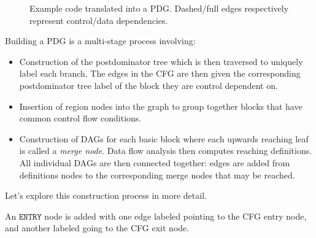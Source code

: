 \begin{figure}
\centering
{}
\caption{Example code translated into a PDG. Dashed/full edges respectively represent control/data dependencies.}
\label{fig:pdg}
\end{figure}

Building a PDG is a multi-stage process involving:

\begin{itemize}
\item Construction of the postdominator tree which is then traversed to uniquely label each branch. The edges in the CFG are then given the corresponding postdominator tree label of the block they are control dependent on.
\item Insertion of region nodes into the graph to group together blocks that have common control flow conditions.
\item Construction of DAGs for each basic block where each upwards reaching leaf is called a \textit{merge node}. Data flow analysis then computes reaching definitions. All individual DAGs are then connected together: edges are added from definitions nodes to the corresponding merge nodes that may be reached.
\end{itemize}

Let's explore this construction process in more detail.

An $\texttt{ENTRY}$ node is added with one edge labeled \true pointing to the CFG entry node, and another labeled \false going to the CFG exit node. 

